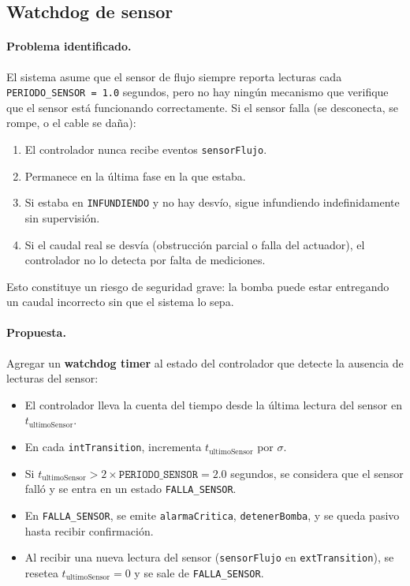 \documentclass[12pt,a4paper]{article}
\begin{document}
\subsection{Watchdog de sensor}

\paragraph{Problema identificado.}  El sistema asume que el sensor de
flujo siempre reporta lecturas cada \texttt{PERIODO\_SENSOR = 1.0}
segundos, pero no hay ningún mecanismo que verifique que el sensor
está funcionando correctamente.  Si el sensor falla (se desconecta,
se rompe, o el cable se daña):

\begin{enumerate}
    \item El controlador nunca recibe eventos \texttt{sensorFlujo}.
    \item Permanece en la última fase en la que estaba.
    \item Si estaba en \texttt{INFUNDIENDO} y no hay desvío, sigue
    infundiendo indefinidamente sin supervisión.
    \item Si el caudal real se desvía (obstrucción parcial o falla
    del actuador), el controlador no lo detecta por falta de
    mediciones.
\end{enumerate}

Esto constituye un riesgo de seguridad grave: la bomba puede estar
entregando un caudal incorrecto sin que el sistema lo sepa.

\paragraph{Propuesta.}  Agregar un \textbf{watchdog timer} al estado
del controlador que detecte la ausencia de lecturas del sensor:

\begin{itemize}
    \item El controlador lleva la cuenta del tiempo desde la última
    lectura del sensor en \(t_{\text{ultimoSensor}}\).
    \item En cada \texttt{intTransition}, incrementa
    \(t_{\text{ultimoSensor}}\) por \(\sigma\).
    \item Si \(t_{\text{ultimoSensor}} > 2 \times
    \texttt{PERIODO\_SENSOR} = 2.0\) segundos, se considera que el
    sensor falló y se entra en un estado \texttt{FALLA\_SENSOR}.
    \item En \texttt{FALLA\_SENSOR}, se emite \texttt{alarmaCritica},
    \texttt{detenerBomba}, y se queda pasivo hasta recibir
    confirmación.
    \item Al recibir una nueva lectura del sensor (\texttt{sensorFlujo}
    en \texttt{extTransition}), se resetea
    \(t_{\text{ultimoSensor}} = 0\) y se sale de
    \texttt{FALLA\_SENSOR}.
\end{itemize}
\end{document}

